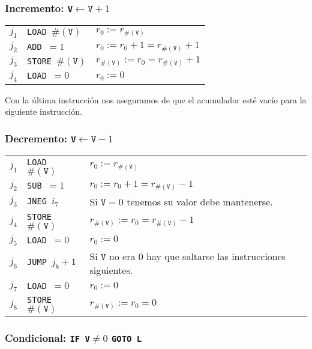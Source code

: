 \documentclass[twoside]{article}
\begin{document}
\subsubsection{Incremento: \texttt{V}$\leftarrow\texttt{V}+1$}

\begin{tabular}{l l l}
$j_1$ & \texttt{LOAD }$\#(\texttt{V})$ & $r_0:=r_{\#(\texttt{V})}$\\
$j_2$ & \texttt{ADD }$=1$              & $r_0:=r_0+1=r_{\#(\texttt{V})}+1$\\
$j_3$ & \texttt{STORE }$\#(\texttt{V})$ & $r_{\#(\texttt{V})}:=r_0=r_{\#(\texttt{V})}+1$\\
$j_4$ & \texttt{LOAD }$=0$               & $r_0:=0$
\end{tabular}

\vspace{0.5cm}

Con la última instrucción nos aseguramos de que el acumulador esté vacío para la siguiente instrucción.


\subsubsection{Decremento: \texttt{V}$\leftarrow\texttt{V}-1$}
 

\begin{tabular}{l l l}
$j_1$ & \texttt{LOAD }$\#(\texttt{V})$ & $r_0:=r_{\#(\texttt{V})}$\\
$j_2$ & \texttt{SUB }$=1$              & $r_0:=r_0+1=r_{\#(\texttt{V})}-1$\\
$j_3$ & \texttt{JNEG }$i_7$ & Si $\texttt{V}=0$ tenemos su valor debe mantenerse.\\
$j_4$ & \texttt{STORE }$\#(\texttt{V})$ & $r_{\#(\texttt{V})}:=r_0=r_{\#(\texttt{V})}-1$\\
$j_5$ & \texttt{LOAD }$=0$               & $r_0:=0$\\
$j_6$ & \texttt{JUMP }$j_8+1$ & Si $\texttt{V}$ no era 0 hay que saltarse las instrucciones siguientes.\\
$j_7$ & \texttt{LOAD }$=0$ & $r_0:=0$\\
$j_8$ & \texttt{STORE }$\#(\texttt{V})$ & $r_{\#(\texttt{V})}:=r_0=0$
\end{tabular}


\subsubsection{Condicional: \texttt{IF V}$\neq 0$ \texttt{GOTO L}}
\end{document}
